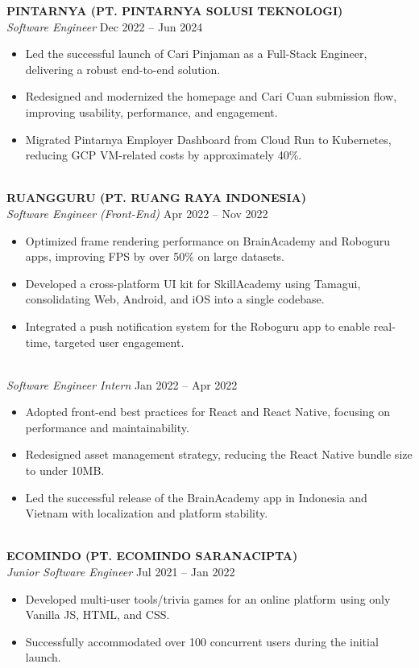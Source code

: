 \documentclass[a4paper,10pt]{article}
\begin{document}
\textbf{PINTARNYA (PT. PINTARNYA SOLUSI TEKNOLOGI)} \\
\textit{Software Engineer} \hfill Dec 2022 -- Jun 2024
\begin{itemize}
    \item Led the successful launch of Cari Pinjaman as a Full-Stack Engineer, delivering a robust end-to-end solution.
    \item Redesigned and modernized the homepage and Cari Cuan submission flow, improving usability, performance, and engagement.
    \item Migrated Pintarnya Employer Dashboard from Cloud Run to Kubernetes, reducing GCP VM-related costs by approximately 40\%.
\end{itemize}\\
\textbf{RUANGGURU (PT. RUANG RAYA INDONESIA)} \\
\textit{Software Engineer (Front-End)} \hfill Apr 2022 -- Nov 2022
\begin{itemize}
    \item Optimized frame rendering performance on BrainAcademy and Roboguru apps, improving FPS by over 50\% on large datasets.
    \item Developed a cross-platform UI kit for SkillAcademy using Tamagui, consolidating Web, Android, and iOS into a single codebase.
    \item Integrated a push notification system for the Roboguru app to enable real-time, targeted user engagement.
\end{itemize}\\
\textit{Software Engineer Intern} \hfill Jan 2022 -- Apr 2022
\begin{itemize}
    \item Adopted front-end best practices for React and React Native, focusing on performance and maintainability.
    \item Redesigned asset management strategy, reducing the React Native bundle size to under 10MB.
    \item Led the successful release of the BrainAcademy app in Indonesia and Vietnam with localization and platform stability.
\end{itemize}\\
\textbf{ECOMINDO (PT. ECOMINDO SARANACIPTA)} \\
\textit{Junior Software Engineer} \hfill Jul 2021 -- Jan 2022
\begin{itemize}
    \item Developed multi-user tools/trivia games for an online platform using only Vanilla JS, HTML, and CSS.
    \item Successfully accommodated over 100 concurrent users during the initial launch.
\end{itemize}
\end{document}
